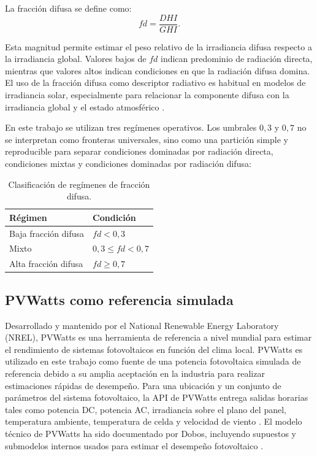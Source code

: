 \documentclass[12pt, letterpaper]{article}
\begin{document}
La fracci\'on difusa se define como:
\[
    fd = \frac{DHI}{GHI}.
\]

Esta magnitud permite estimar el peso relativo de la irradiancia difusa respecto a la irradiancia global. Valores bajos de \(fd\) indican predominio de radiaci\'on directa, mientras que valores altos indican condiciones en que la radiaci\'on difusa domina. El uso de la fracci\'on difusa como descriptor radiativo es habitual en modelos de irradiancia solar, especialmente para relacionar la componente difusa con la irradiancia global y el estado atmosf\'erico \cite{erbs1982}.

En este trabajo se utilizan tres reg\'imenes operativos. Los umbrales \(0{,}3\) y \(0{,}7\) no se interpretan como fronteras universales, sino como una partici\'on simple y reproducible para separar condiciones dominadas por radiaci\'on directa, condiciones mixtas y condiciones dominadas por radiaci\'on difusa:

\begin{table}[H]
\centering
\caption{Clasificaci\'on de reg\'imenes de fracci\'on difusa.}
\label{tab:clasificacion_fd}
\begin{tabular}{ll}
\toprule
\textbf{R\'egimen} & \textbf{Condici\'on} \\
\midrule
Baja fracci\'on difusa & \(fd < 0{,}3\) \\
Mixto & \(0{,}3 \leq fd < 0{,}7\) \\
Alta fracci\'on difusa & \(fd \geq 0{,}7\) \\
\bottomrule
\end{tabular}
\end{table}

\subsection{PVWatts como referencia simulada}

Desarrollado y mantenido por el National Renewable Energy Laboratory (NREL), PVWatts es una herramienta de referencia a nivel mundial para estimar el rendimiento de sistemas fotovoltaicos en funci\'on del clima local. PVWatts es utilizado en este trabajo como fuente de una potencia fotovoltaica simulada de referencia debido a su amplia aceptaci\'on en la industria para realizar estimaciones r\'apidas de desempe\~no. Para una ubicaci\'on y un conjunto de par\'ametros del sistema fotovoltaico, la API de PVWatts entrega salidas horarias tales como potencia DC, potencia AC, irradiancia sobre el plano del panel, temperatura ambiente, temperatura de celda y velocidad de viento \cite{pvwatts2026}. El modelo t\'ecnico de PVWatts ha sido documentado por Dobos, incluyendo supuestos y submodelos internos usados para estimar el desempe\~no fotovoltaico .
\end{document}
